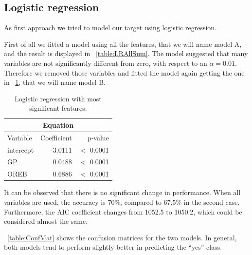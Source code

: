 \subsection{Logistic regression}\label{appendix:lr}

As first approach we tried to model our target using logistic regression.

First of all we fitted a model using all the features, that we will name model A, and the result is displayed in \Tab~\ref{table:LRAllSum}. The model suggested that many variables are not significantly different from zero, with respect to an $\alpha = 0.01$. Therefore we removed those variables and fitted the model again getting the one in \Tab~\ref{table:LRImpSum}, that we will name model B.

\begin{table}[H]
	\centering
	\begin{tabular}{|| l | r | r ||} 
		\hline
		\multicolumn{3}{|c|}{Equation} \\
		\hline
		Variable & Coefficient & p-value \\
		\hline
		intercept & -3.0111 & $<$ 0.0001 \\
		GP & 0.0488 & $<$ 0.0001 \\
		OREB & 0.6886 & $<$ 0.0001 \\	
		\hline
	\end{tabular}
	\caption{Logistic regression with most significant features.}
	\label{table:LRImpSum}
\end{table}

It can be observed that there is no significant change in performance. When all variables are used, the accuracy is $70\%$, compared to $67.5\%$ in the second case. Furthermore, the AIC coefficient changes from 1052.5 to 1050.2, which could be considered almost the same. 

\Tab~\ref{table:ConfMat} shows the confusion matrices for the two models. In general, both models tend to perform slightly better in predicting the ``yes'' class.


